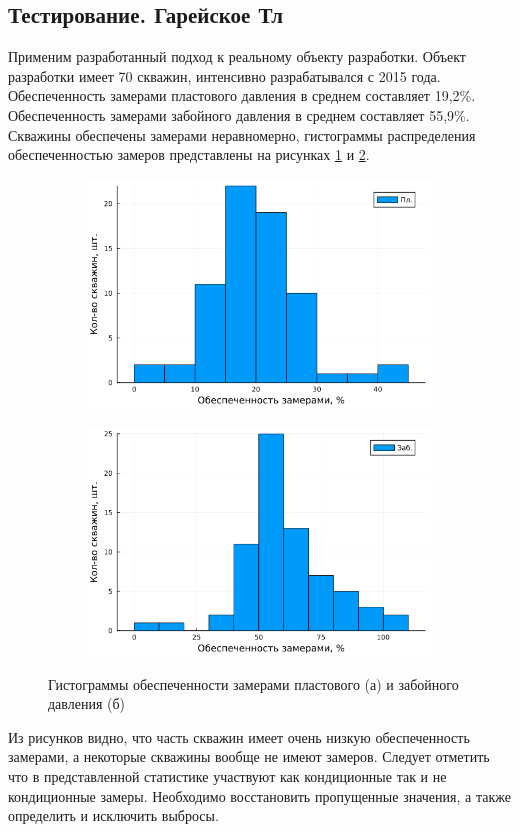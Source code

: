 \documentclass[14pt]{article}
\begin{document}
\subsection{Тестирование. Гарейское Тл}
Применим разработанный подход к реальному объекту разработки. Объект разработки имеет 70 скважин, интенсивно разрабатывался с 2015 года. Обеспеченность замерами пластового давления  в среднем составляет 19,2\%. Обеспеченность замерами забойного давления в среднем составляет 55,9\%. Скважины обеспечены замерами неравномерно, гистограммы распределения обеспеченностью замеров представлены на рисунках \ref{fig:gar_hist_ppl_a} и \ref{fig:gar_hist_pw_b}. 
\begin{figure}[!htb]
	\begin{subfigure}[b]{0.45\linewidth}
		\includegraphics[width=\linewidth]{pic/hist_gar_ppl}
		\caption{}
		\label{fig:gar_hist_ppl_a}
	\end{subfigure}
	\begin{subfigure}[b]{0.45\linewidth}
		\includegraphics[width=\linewidth]{pic/hist_gar_pw}
		\caption{}
		\label{fig:gar_hist_pw_b}
	\end{subfigure}
	\label{fig:gar_hist}
	\caption{Гистограммы обеспеченности замерами пластового (а) и забойного давления (б)}
\end{figure}
Из рисунков видно, что часть скважин имеет очень низкую обеспеченность замерами, а некоторые скважины вообще не имеют замеров. Следует отметить что в представленной статистике участвуют как кондиционные так и не кондиционные замеры. Необходимо восстановить пропущенные значения, а также определить и исключить выбросы. 
\end{document}
